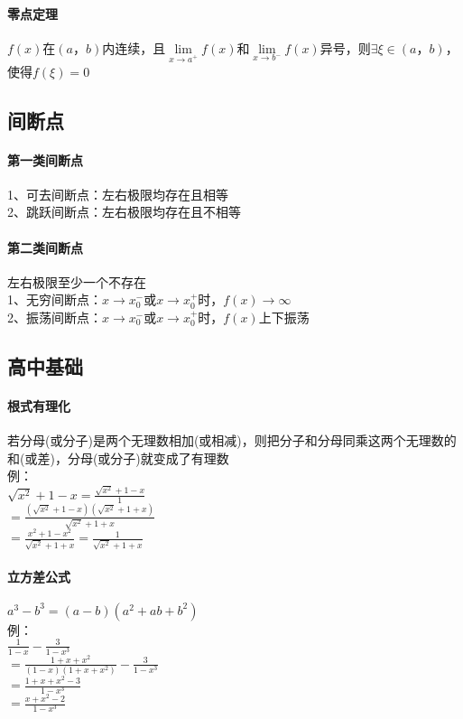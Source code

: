\documentclass{article}
\begin{document}
\begin{flushleft}
\paragraph{零点定理}
$f(x)$在$(a，b)$内连续，且$\lim\limits_{x\to a^+} f(x)$和$\lim\limits_{x\to b^-} f(x)$异号，则$\exists \xi \in (a，b)$，使得$f(\xi)=0$\\

\subsection{间断点}

\paragraph{第一类间断点}
1、可去间断点：左右极限均存在且相等\\
2、跳跃间断点：左右极限均存在且不相等\\
\paragraph{第二类间断点}
左右极限至少一个不存在\\
1、无穷间断点：$x\to x_0^-$或$x\to x_0^+$时，$f(x)\to \infty$\\
2、振荡间断点：$x\to x_0^-$或$x\to x_0^+$时，$f(x)$上下振荡\\

\subsection{高中基础}

\paragraph{根式有理化}
若分母(或分子)是两个无理数相加(或相减)，则把分子和分母同乘这两个无理数的和(或差)，分母(或分子)就变成了有理数\\
例：\\
\qquad $\sqrt{x^2}+1-x=\frac{\sqrt{x^2}+1-x}{1}$\\
\qquad $=\frac{(\sqrt{x^2}+1-x)(\sqrt{x^2}+1+x)}{\sqrt{x^2}+1+x}$\\
\qquad $=\frac{x^2+1-x^2}{\sqrt{x^2}+1+x}=\frac{1}{\sqrt{x^2}+1+x}$\\

\paragraph{立方差公式}
$a^3-b^3=(a-b)(a^2+ab+b^2)$\\
例：\\
\qquad $\frac{1}{1-x}-\frac{3}{1-x^3}$\\
\qquad $=\frac{1+x+x^2}{(1-x)(1+x+x^2)}-\frac{3}{1-x^3}$\\
\qquad $=\frac{1+x+x^2-3}{1-x^3}$\\
\qquad $=\frac{x+x^2-2}{1-x^3}$\\


\end{flushleft}
\end{document}
